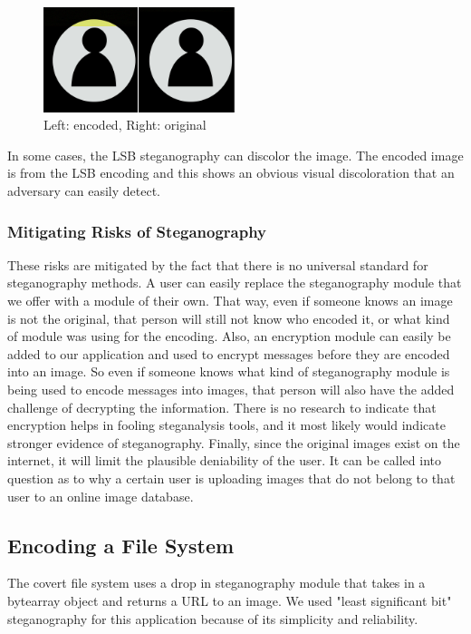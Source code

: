 \begin{figure}[h]
	\includegraphics[width=0.5\textwidth]{comparison}
	\caption{Left: encoded, Right: original}
\end{figure}
In some cases, the LSB steganography can discolor the image. The encoded image is from the LSB encoding and this shows an obvious visual discoloration that an adversary can easily detect. 

\subsubsection{Mitigating Risks of Steganography}
These risks are mitigated by the fact that there is no universal standard for steganography methods. A user can easily replace the steganography module that we offer with a module of their own. That way, even if someone knows an image is not the original, that person will still not know who encoded it, or what kind of module was using for the encoding. Also, an encryption module can easily be added to our application and used to encrypt messages before they are encoded into an image. So even if someone knows what kind of steganography module is being used to encode messages into images, that person will also have the added challenge of decrypting the information. There is no research to indicate that encryption helps in fooling steganalysis tools, and it most likely would indicate stronger evidence of steganography. Finally, since the original images exist on the internet, it will limit the plausible deniability of the user. It can be called into question as to why a certain user is uploading images that do not belong to that user to an online image database. 

\subsection{Encoding a File System}

The covert file system uses a drop in steganography module that takes in a bytearray object and returns a URL to an image. We used "least significant bit" steganography for this application because of its simplicity and reliability.

